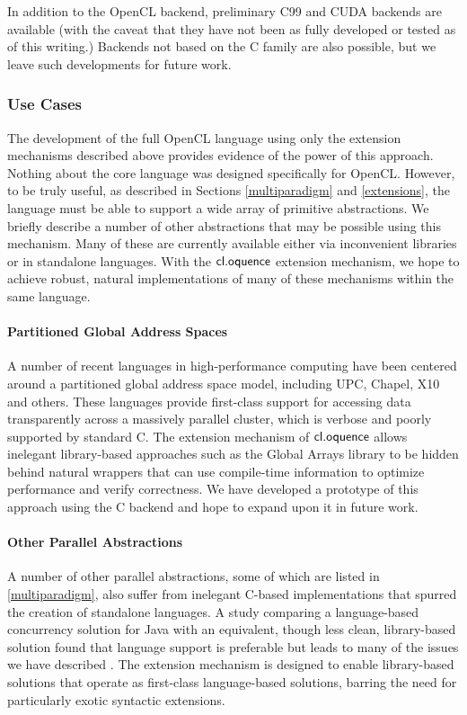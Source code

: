 \documentclass[10pt, conference, compsocconf]{IEEEtran}
\begin{document}
In addition to the OpenCL backend, preliminary C99 and CUDA backends are available (with the caveat that they have not been as fully developed or tested as of this writing.) Backends not based on the C family are also possible, but we leave such developments for future work.


\subsubsection{Use Cases}
The development of the full OpenCL language using only the extension mechanisms described above provides evidence of the power of this approach. Nothing about the core language was designed specifically for OpenCL. However, to be truly useful, as described in Sections \ref{multiparadigm} and  \ref{extensions}, the language must be able to support a wide array of primitive abstractions. We briefly describe a number of other abstractions that may be possible using this mechanism. Many of these are currently available either via inconvenient libraries or in standalone languages. With the $\textsf{cl.oquence}$ extension mechanism, we hope to achieve robust, natural implementations of many of these mechanisms within the same language.

\paragraph{Partitioned Global Address Spaces}
A number of recent languages in high-performance computing have been centered around a partitioned global address space model, including UPC, Chapel, X10 and others. These languages provide first-class support for accessing data transparently across a massively parallel cluster, which is verbose and poorly supported by standard C. The extension mechanism of $\textsf{cl.oquence}$ allows inelegant library-based approaches such as the Global Arrays library to be hidden behind natural wrappers that can use compile-time information to optimize performance and verify correctness. We have developed a prototype of this approach using the C backend and hope to expand upon it in future work.

\paragraph{Other Parallel Abstractions}
A number of other parallel abstractions, some of which are listed in \ref{multiparadigm}, also suffer from inelegant C-based implementations that spurred the creation of standalone languages. A study comparing a language-based concurrency solution for Java with an equivalent, though less clean, library-based solution found that language support is preferable but leads to many of the issues we have described \cite{cave2010comparing}. The extension mechanism is designed to enable library-based solutions that operate as first-class language-based solutions, barring the need for particularly exotic syntactic extensions.
\end{document}
